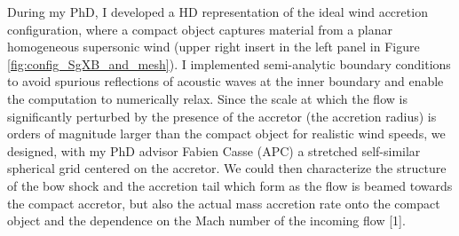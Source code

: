 \documentclass[12pt,onecolumn]{article}
\begin{document}
During my PhD, I developed a HD representation of the ideal wind accretion configuration, where a compact object captures material from a planar homogeneous supersonic wind (upper right insert in the left panel in Figure\,\ref{fig:config_SgXB_and_mesh}). I implemented semi-analytic boundary conditions to avoid spurious reflections of acoustic waves at the inner boundary and enable the computation to numerically relax. Since the scale at which the flow is significantly perturbed by the presence of the accretor (the accretion radius) is orders of magnitude larger than the compact object for realistic wind speeds, we designed, with my PhD advisor Fabien Casse (APC) a stretched self-similar spherical grid centered on the accretor. We could then characterize the structure of the bow shock and the accretion tail which form as the flow is beamed towards the compact accretor, but also the actual mass accretion rate onto the compact object and the dependence on the Mach number of the incoming flow [1]. 
\end{document}
